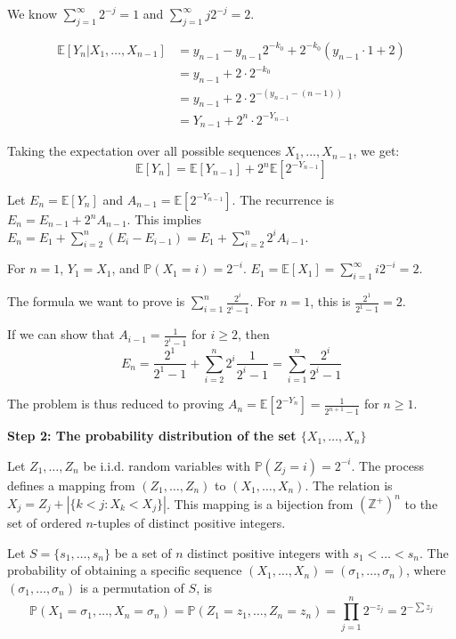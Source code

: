\documentclass[12pt,a4paper]{article}
\theoremstyle{definition}
\begin{document}
        We know $\sum_{j=1}^{\infty} 2^{-j} = 1$ and $\sum_{j=1}^{\infty} j 2^{-j} = 2$.

        \begin{align*}
            \mathbb{E}[Y_n | X_1, \ldots, X_{n-1}] &= y_{n-1} - y_{n-1}2^{-k_0} + 2^{-k_0}(y_{n-1} \cdot 1 + 2) \\
            &= y_{n-1} + 2 \cdot 2^{-k_0} \\
            &= y_{n-1} + 2 \cdot 2^{-(y_{n-1}-(n-1))} \\
            &= Y_{n-1} + 2^n \cdot 2^{-Y_{n-1}}
        \end{align*}

        Taking the expectation over all possible sequences $X_1, \ldots, X_{n-1}$, we get:
        \[ \mathbb{E}[Y_n] = \mathbb{E}[Y_{n-1}] + 2^n \mathbb{E}[2^{-Y_{n-1}}] \]

        Let $E_n = \mathbb{E}[Y_n]$ and $A_{n-1} = \mathbb{E}[2^{-Y_{n-1}}]$. The recurrence is $E_n = E_{n-1} + 2^n A_{n-1}$.
        This implies $E_n = E_1 + \sum_{i=2}^n (E_i - E_{i-1}) = E_1 + \sum_{i=2}^n 2^i A_{i-1}$.

        For $n=1$, $Y_1=X_1$, and $\mathbb{P}(X_1=i)=2^{-i}$.
        $E_1 = \mathbb{E}[X_1] = \sum_{i=1}^\infty i 2^{-i} = 2$.

        The formula we want to prove is $\sum_{i=1}^n \frac{2^i}{2^i-1}$. For $n=1$, this is $\frac{2^1}{2^1-1}=2$.

        If we can show that $A_{i-1} = \frac{1}{2^i-1}$ for $i \geq 2$, then
        \[ E_n = \frac{2^1}{2^1-1} + \sum_{i=2}^n 2^i \frac{1}{2^i-1} = \sum_{i=1}^n \frac{2^i}{2^i-1} \]

        The problem is thus reduced to proving $A_n = \mathbb{E}[2^{-Y_n}] = \frac{1}{2^{n+1}-1}$ for $n \geq 1$.

        \textbf{Step 2: The probability distribution of the set $\{X_1, \ldots, X_n\}$}

        Let $Z_1, \ldots, Z_n$ be i.i.d. random variables with $\mathbb{P}(Z_j=i)=2^{-i}$. The process defines a mapping from $(Z_1, \ldots, Z_n)$ to $(X_1, \ldots, X_n)$. The relation is $X_j = Z_j + |\{k<j : X_k < X_j\}|$. This mapping is a bijection from $(\mathbb{Z}^+)^n$ to the set of ordered $n$-tuples of distinct positive integers.

        Let $S=\{s_1, \ldots, s_n\}$ be a set of $n$ distinct positive integers with $s_1 < \ldots < s_n$.
        The probability of obtaining a specific sequence $(X_1, \ldots, X_n) = (\sigma_1, \ldots, \sigma_n)$, where $(\sigma_1, \ldots, \sigma_n)$ is a permutation of $S$, is
        \[ \mathbb{P}(X_1=\sigma_1, \ldots, X_n=\sigma_n) = \mathbb{P}(Z_1=z_1, \ldots, Z_n=z_n) = \prod_{j=1}^n 2^{-z_j} = 2^{-\sum z_j} \]
\end{document}
